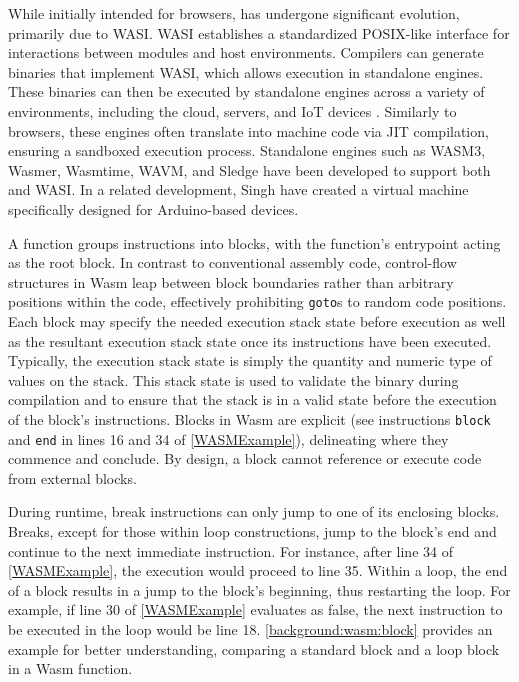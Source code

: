While initially intended for browsers, \Wasm has undergone significant evolution, primarily due to WASI\cite{WASI}.
WASI establishes a standardized POSIX-like interface for interactions between \Wasm modules and host environments.
Compilers can generate \Wasm binaries that implement WASI, which allows execution in standalone engines.
These binaries can then be executed by standalone engines across a variety of environments, including the cloud, servers, and IoT devices \cite{makitalo2021webassembly}.
Similarly to browsers, these engines often translate \Wasm into machine code via JIT compilation, ensuring a sandboxed execution process.
Standalone engines such as WASM3, Wasmer, Wasmtime, WAVM, and Sledge\cite{Sledge} have been developed to support both \Wasm and WASI.
In a related development, Singh \etal\cite{WARDuino2019} have created a \Wasm virtual machine specifically designed for Arduino-based devices.


\label{wasm:control_flow}

A \Wasm function groups instructions into blocks, with the function's entrypoint acting as the root block. 
In contrast to conventional assembly code, control-flow structures in Wasm leap between block boundaries rather than arbitrary positions within the code, effectively prohibiting \texttt{goto}s to random code positions. 
Each block may specify the needed execution stack state before execution as well as the resultant execution stack state once its instructions have been executed.
Typically, the execution stack state is simply the quantity and numeric type of values on the stack. 
This stack state is used to validate the binary during compilation and to ensure that the stack is in a valid state before the execution of the block's instructions.
Blocks in Wasm are explicit (see instructions \texttt{block} and \texttt{end} in lines 16 and 34 of \autoref{WASMExample}), delineating where they commence and conclude.
By design, a block cannot reference or execute code from external blocks.


During runtime, \Wasm break instructions can only jump to one of its enclosing blocks. 
Breaks, except for those within loop constructions, jump to the block's end and continue to the next immediate instruction. 
For instance, after line 34 of \autoref{WASMExample}, the execution would proceed to line 35. 
Within a loop, the end of a block results in a jump to the block's beginning, thus restarting the loop. 
For example, if line 30 of \autoref{WASMExample} evaluates as false, the next instruction to be executed in the loop would be line 18. 
\autoref{background:wasm:block} provides an example for better understanding, comparing a standard block and a loop block in a Wasm function.

